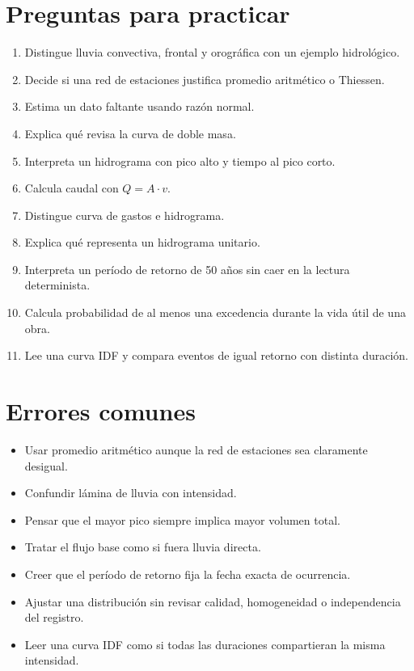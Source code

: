\documentclass[11pt]{article}
\begin{document}
\section{Preguntas para practicar}
\begin{enumerate}
\item Distingue lluvia convectiva, frontal y orográfica con un ejemplo hidrológico.
\item Decide si una red de estaciones justifica promedio aritmético o Thiessen.
\item Estima un dato faltante usando razón normal.
\item Explica qué revisa la curva de doble masa.
\item Interpreta un hidrograma con pico alto y tiempo al pico corto.
\item Calcula caudal con \(Q=A\cdot v\).
\item Distingue curva de gastos e hidrograma.
\item Explica qué representa un hidrograma unitario.
\item Interpreta un período de retorno de 50 años sin caer en la lectura determinista.
\item Calcula probabilidad de al menos una excedencia durante la vida útil de una obra.
\item Lee una curva IDF y compara eventos de igual retorno con distinta duración.
\end{enumerate}

\section{Errores comunes}
\begin{warnbox}
\begin{itemize}
\item Usar promedio aritmético aunque la red de estaciones sea claramente desigual.
\item Confundir lámina de lluvia con intensidad.
\item Pensar que el mayor pico siempre implica mayor volumen total.
\item Tratar el flujo base como si fuera lluvia directa.
\item Creer que el período de retorno fija la fecha exacta de ocurrencia.
\item Ajustar una distribución sin revisar calidad, homogeneidad o independencia del registro.
\item Leer una curva IDF como si todas las duraciones compartieran la misma intensidad.
\end{itemize}
\end{warnbox}
\end{document}
